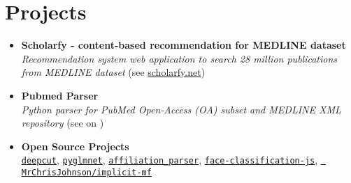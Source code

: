 \section{\sc Projects}
\begin{itemize}[leftmargin=0cm, label={}]

\item {\bf Scholarfy - content-based recommendation for MEDLINE dataset}\\
{\em Recommendation system web application to search 28 million publications from MEDLINE dataset} (see \href{http://www.scholarfy.net/}{scholarfy.net})

\item {\bf Pubmed Parser}\\
{\em Python parser for PubMed Open-Access (OA) subset and MEDLINE XML repository} (see on \href{https://github.com/titipata/pubmed_parser}{\faGithubAlt})

\item {\bf Open Source Projects}\\
\href{https://github.com/rkcosmos/deepcut}{\texttt{deepcut}},
\href{https://github.com/glm-tools/pyglmnet}{\texttt{pyglmnet}},
\href{https://github.com/titipata/affiliation\_parser}{\texttt{affiliation\_parser}},
\href{https://github.com/tupleblog/face-classification-js}{\texttt{face-classification-js}},
\href{https://github.com/MrChrisJohnson/implicit-mf}{\texttt{
MrChrisJohnson/implicit-mf}}

\end{itemize}
